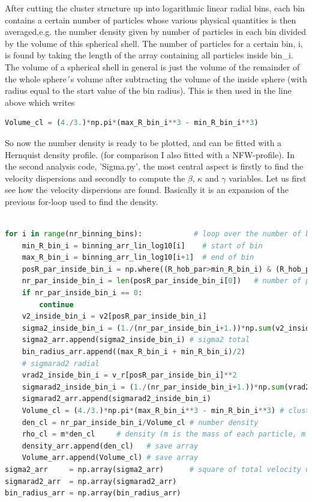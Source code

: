 After cutting the cluster structure up into logarithmic linear radial bins, each bin contains a certain number of particles whose various physical quantities is then averaged,e.g. the number density given by number of particles in each bin divided by the volume of this spherical shell. The number of particles for a certain bin, i,  is found by taking the length of the array containing all particles inside  bin\_i. The volume of a spherical shell in general is just the volume of the remainder of the whole sphere´s volume after subtracting the volume of the inside sphere (with radius equal to the start value of the bin radius). This is then used in the line above which writes  \\
\begin{pythonstyle}
\begin{lstlisting}[language=Python]
Volume_cl = (4./3.)*np.pi*(max_R_bin_i**3 - min_R_bin_i**3)
\end{lstlisting}
\end{pythonstyle}
So now the number density is ready to be plotted, and can be fitted with a Hernquist density profile. (for comparison I also fitted with a NFW-profile). In the second analysis code, 'Sigma.py', the most central aspect is firstly to find the velocity dispersions and secondly to compute the $ \beta$, $ \kappa$ and $ \gamma$ variables. Let us first see how the velocity dispersions are found. Basically it is an expansion of the previous for-loop used to find the density. \\ \\
\begin{pythonstyle}
\begin{lstlisting}[language=Python]
for i in range(nr_binning_bins):            # loop over the number of bins  
    min_R_bin_i = binning_arr_lin_log10[i]    # start of bin 
    max_R_bin_i = binning_arr_lin_log10[i+1]  # end of bin 
    posR_par_inside_bin_i = np.where((R_hob_par>min_R_bin_i) & (R_hob_par<max_R_bin_i)) # Particle positions
    nr_par_inside_bin_i = len(posR_par_inside_bin_i[0])   # number of particles inside a radial bin 
    if nr_par_inside_bin_i == 0: 
        continue 
    v2_inside_bin_i = v2[posR_par_inside_bin_i] 
    sigma2_inside_bin_i = (1./(nr_par_inside_bin_i+1.))*np.sum(v2_inside_bin_i) 
    sigma2_arr.append(sigma2_inside_bin_i) # sigma2 total 
    bin_radius_arr.append((max_R_bin_i + min_R_bin_i)/2) 
    # sigmarad2 radial 
    vrad2_inside_bin_i = v_r[posR_par_inside_bin_i]**2 
    sigmarad2_inside_bin_i = (1./(nr_par_inside_bin_i+1.))*np.sum(vrad2_inside_bin_i) 
    sigmarad2_arr.append(sigmarad2_inside_bin_i) 
    Volume_cl = (4./3.)*np.pi*(max_R_bin_i**3 - min_R_bin_i**3) # cluster volume
    den_cl = nr_par_inside_bin_i/Volume_cl # number density 
    rho_cl = m*den_cl     # density (m is the mass of each particle, m = M/N = 1/N)
    density_arr.append(den_cl)   # save array
    Volume_arr.append(Volume_cl) # save array 
sigma2_arr     = np.array(sigma2_arr)      # square of total velocity dispersion 
sigmarad2_arr  = np.array(sigmarad2_arr) 
bin_radius_arr = np.array(bin_radius_arr) 
\end{lstlisting}
\end{pythonstyle}

